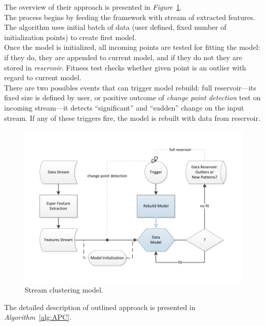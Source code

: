 \documentclass[11pt, letterpaper]{article}            %
\begin{document}
The overview of their approach is presented in \emph{Figure}~\ref{fig:APC}.\\

The process begins by feeding the framework with stream of extracted features. The algorithm uses initial batch of data (user defined, fixed number of initialization points) to create first model.\\
Once the model is initialized, all incoming points are tested for fitting the model: if they do, they are appended to current model, and if they do not they are stored in \emph{reservoir}. Fitness test checks whether given point is an outlier with regard to current model.\\
There are two possibles events that can trigger model rebuild: full reservoir---its fixed size is defined by user, or positive outcome of \emph{change point detection} test on incoming stream---it detects ``significant'' and ``sudden'' change on the input stream. If any of these triggers fire, the model is rebuilt with data from reservoir.\\

\begin{figure}[htbp]
    \centering
    \includegraphics[width=\textwidth]{./gfx/APC_Presentation.pdf}
  \caption{Stream clustering model.\label{fig:APC}}
\end{figure}

\noindent The detailed description of outlined approach is presented in \emph{Algorithm}~\ref{alg:APC}.\\
\end{document}

